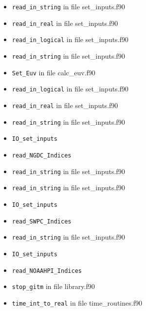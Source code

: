 \begin{itemize}
\begin{itemize}
    \item {\tt read\_in\_string} in file set\_inputs.f90
    \item {\tt read\_in\_real} in file set\_inputs.f90
    \item {\tt read\_in\_logical} in file set\_inputs.f90
    \item {\tt read\_in\_string} in file set\_inputs.f90
    \item {\tt Set\_Euv} in file calc\_euv.f90
    \item {\tt read\_in\_logical} in file set\_inputs.f90
    \item {\tt read\_in\_real} in file set\_inputs.f90
    \item {\tt read\_in\_string} in file set\_inputs.f90
    \item {\tt IO\_set\_inputs}
    \item {\tt read\_NGDC\_Indices}
    \item {\tt read\_in\_string} in file set\_inputs.f90
    \item {\tt read\_in\_string} in file set\_inputs.f90
    \item {\tt IO\_set\_inputs}
    \item {\tt read\_SWPC\_Indices}
    \item {\tt read\_in\_string} in file set\_inputs.f90
    \item {\tt IO\_set\_inputs}
    \item {\tt read\_NOAAHPI\_Indices}
    \item {\tt stop\_gitm} in file library.f90
    \item {\tt time\_int\_to\_real} in file time\_routines.f90
  \end{itemize}



\end{itemize}
